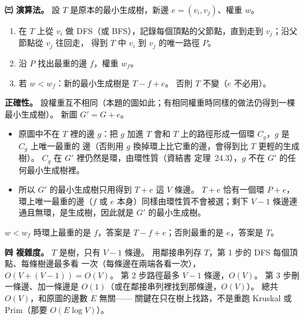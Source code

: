\begin{pastsoln}
\textbf{㈢ 演算法。} 設 $T$ 是原本的最小生成樹，新邊 $e = (v_i, v_j)$、權重 $w$。
\begin{enumerate}
\item 在 $T$ 上從 $v_i$ 做 DFS（或 BFS），記錄每個頂點的父節點，直到走到 $v_j$；沿父節點從 $v_j$ 往回走，
得到 $T$ 中 $v_i$ 到 $v_j$ 的唯一路徑 $P$。
\item 沿 $P$ 找出最重的邊 $f$，權重 $w_f$。
\item 若 $w < w_f$：新的最小生成樹是 $T - f + e$。 否則 $T$ 不變（$e$ 不必用）。
\end{enumerate}
\textbf{正確性。} 設權重互不相同（本題的圖如此；有相同權重時同樣的做法仍得到一棵最小生成樹）。 新圖
$G' = G + e$。
\begin{itemize}
\item 原圖中不在 $T$ 裡的邊 $g$：把 $g$ 加進 $T$ 會和 $T$ 上的路徑形成一個環 $C_g$，$g$ 是 $C_g$ 上唯一最重的
邊（否則用 $g$ 換掉環上比它重的邊，會得到比 $T$ 更輕的生成樹）。 $C_g$ 在 $G'$ 裡仍然是環，由環性質（資結書
定理~24.3），$g$ 不在 $G'$ 的任何最小生成樹裡。
\item 所以 $G'$ 的最小生成樹只用得到 $T + e$ 這 $V$ 條邊。 $T + e$ 恰有一個環 $P + e$，環上唯一最重的邊（$f$
或 $e$ 本身）同樣由環性質不會被選；剩下 $V - 1$ 條邊連通且無環，是生成樹，因此就是 $G'$ 的最小生成樹。
\end{itemize}
$w < w_f$ 時環上最重的是 $f$，答案是 $T - f + e$；否則最重的是 $e$，答案是 $T$。

\textbf{㈣ 複雜度。} $T$ 是樹，只有 $V - 1$ 條邊。 用鄰接串列存 $T$，第 1 步的 DFS 每個頂點、每條樹邊最多看
一次（每條邊在兩端各看一次），$O(V + (V - 1)) = O(V)$。 第 2 步路徑最多 $V - 1$ 條邊，$O(V)$。 第 3 步刪
一條邊、加一條邊是 $O(1)$（或在鄰接串列裡找到那條邊，$O(V)$）。 總共 $O(V)$，和原圖的邊數 $E$ 無關——
關鍵在只在樹上找路，不是重跑 Kruskal 或 Prim（那要 $O(E \log V)$）。
\end{pastsoln}
